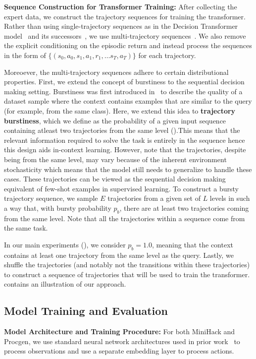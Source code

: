 \textbf{Sequence Construction for Transformer Training: }
After collecting the expert data, we construct the trajectory sequences for training the transformer. Rather than using single-trajectory sequences as in the Decision Transformer model~\citep{decision_transformer} and its successors~\citep{traj_transformer, MGDT}, we use multi-trajectory sequences~\citep{adaptiveagentteam2023humantimescale, algo_dist}. We also remove the explicit conditioning on the episodic return and instead process the sequences in the form of $\{(s_0, a_0, s_1, a_1, r_1, \dots s_T, a_T)\}$ for each trajectory.


Moreoever, the multi-trajectory sequences adhere to certain distributional properties. First, we extend the concept of burstiness to the sequential decision making setting. Burstiness was first introduced in~\cite{zipfian_icl} to describe the quality of a dataset sample where the context contains examples that are similar to the query (for example, from the same class). Here, we extend this idea to \textbf{trajectory burstiness}, which we define as the probability of a given input sequence containing atleast two trajectories from the same level ().This means that the relevant information required to solve the task is entirely in the sequence hence this design aids in-context learning. However, note that the trajectories, despite being from the same level, may vary because of the inherent environment stochasticity which means that the model still needs to generalize to handle these cases. These trajectories can be viewed as the sequential decision making equivalent of few-shot examples in supervised learning. To construct a bursty trajectory sequence, we sample $E$ trajectories from a given set of $L$ levels in such a way that, with bursty probability $p_b$, there are at least two trajectories coming from the same level. Note that all the trajectories within a sequence come from the same task. 


In our main experiments (), we consider $p_b=1.0$, meaning that the context contains at least one trajectory from the same level as the query. Lastly, we shuffle the trajectories (and notably not the transitions within these trajectories) to construct a sequence of trajectories that will be used to train the transformer.  contains an illustration of our approach. 


\subsection{Model Training and Evaluation}
\label{sec:train_eval}
\textbf{Model Architecture and Training Procedure:}
For both MiniHack and Procgen, we use standard neural network architectures used in prior work~\citep{samvelyan2021minihack, cobbe2020leveraging} to process observations and use a separate embedding layer to process actions. 

